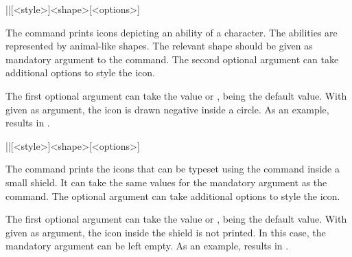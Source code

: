 \documentclass[a4paper]{article}
\begin{document}
\begin{macrodef}|\ability|[<style>]{<shape>}[<options>]\end{macrodef}
The command \macro{\ability} prints icons depicting an ability of a character. The abilities are represented by animal-like shapes. The relevant shape should be given as mandatory argument to the command. The second optional argument can take additional options to style the icon.

The first optional argument can take the value  or ,  being the default value. With  given as argument, the icon is drawn negative inside a circle. As an example,  results in .

\begin{macrodef}|\saving|[<style>]{<shape>}[<options>]\end{macrodef}
The command \macro{\saving} prints the icons that can be typeset using the \macro{\ability} command inside a small shield. It can take the same values for the mandatory argument as the \macro{\ability} command. The optional argument can take additional options to style the icon.

The first optional argument can take the value  or ,  being the default value. With  given as argument, the icon inside the shield is not printed. In this case, the mandatory argument can be left empty. As an example, \macro{\saving[empty]{}} results in \saving[empty]{}. 
\end{document}
